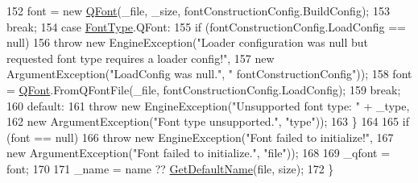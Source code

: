 \begin{DoxyCode}
152                     font = \textcolor{keyword}{new} \hyperlink{class_tri_devs_1_1_tri_engine2_d_1_1_text_1_1_font_a019de011e935ea9017eb805ff778581a}{QFont}(\_file, \_size, fontConstructionConfig.BuildConfig);
153                     \textcolor{keywordflow}{break};
154                 \textcolor{keywordflow}{case} \hyperlink{namespace_tri_devs_1_1_tri_engine2_d_1_1_text_aa624efa98f1dcfec7cddff37f08bbe75}{FontType}.QFont:
155                     \textcolor{keywordflow}{if} (fontConstructionConfig.LoadConfig == null)
156                         \textcolor{keywordflow}{throw} \textcolor{keyword}{new} EngineException(\textcolor{stringliteral}{"Loader configuration was null but requested font type
       requires a loader config!"},
157                                                   \textcolor{keyword}{new} ArgumentException(\textcolor{stringliteral}{"LoadConfig was null."}, \textcolor{stringliteral}{"
      fontConstructionConfig"}));
158                     font = \hyperlink{class_tri_devs_1_1_tri_engine2_d_1_1_text_1_1_font_a019de011e935ea9017eb805ff778581a}{QFont}.FromQFontFile(\_file, fontConstructionConfig.LoadConfig);
159                     \textcolor{keywordflow}{break};
160                 \textcolor{keywordflow}{default}:
161                     \textcolor{keywordflow}{throw} \textcolor{keyword}{new} EngineException(\textcolor{stringliteral}{"Unsupported font type: "} + \_type,
162                                               \textcolor{keyword}{new} ArgumentException(\textcolor{stringliteral}{"Font type unsupported."}, \textcolor{stringliteral}{"type"}));
163             \}
164 
165             \textcolor{keywordflow}{if} (font == null)
166                 \textcolor{keywordflow}{throw} \textcolor{keyword}{new} EngineException(\textcolor{stringliteral}{"Font failed to initialize!"},
167                                           \textcolor{keyword}{new} ArgumentException(\textcolor{stringliteral}{"Font failed to initialize."}, \textcolor{stringliteral}{"file"}));
168 
169             \_qfont = font;
170 
171             \_name = name ?? \hyperlink{class_tri_devs_1_1_tri_engine2_d_1_1_text_1_1_font_a27c7b15b894bd63bcebc831f00a1a0b3}{GetDefaultName}(file, size);
172         \}
\end{DoxyCode}


